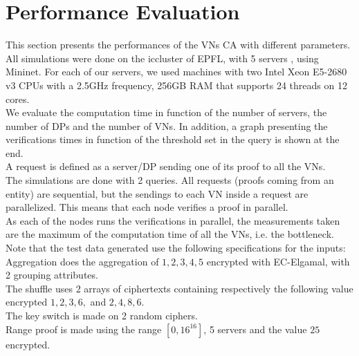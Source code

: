 \documentclass{article}
\begin{document}
\section{Performance Evaluation}
This section presents the performances of the VNs CA with different parameters. All simulations were done on the iccluster of EPFL, with 5 servers \cite{cluster}, using Mininet. For each of our servers, we used machines with two Intel Xeon E5-2680 v3 CPUs with a 2.5GHz frequency, 256GB RAM that supports 24 threads on 12 cores.\\
We evaluate the computation time in function of the number of servers, the number of DPs and the number of VNs. In addition, a graph presenting the verifications times in function of the threshold set in the query is shown at the end.\\
A request is defined as a server/DP sending one of its proof to all the VNs.\\
The simulations are done with 2 queries. All requests (proofs coming from an entity) are sequential, but the sendings to each VN inside a request are parallelized. This means that each node verifies a proof in parallel.\\
As each of the nodes runs the verifications in parallel, the measurements taken are the maximum of the computation time of all the VNs, i.e. the bottleneck.\\


Note that the test data generated use the following specifications for the inputs:\\
Aggregation does the aggregation of $1,2,3,4,5$ encrypted with EC-Elgamal, with 2 grouping attributes.\\
The shuffle uses 2 arrays of ciphertexts containing respectively the following value encrypted $1,2,3,6,$ and $2,4,8,6$. \\
The key switch is made on 2 random ciphers.\\
Range proof is made using the range $[0,16^{16}]$, 5 servers and the value $25$ encrypted.
\end{document}
